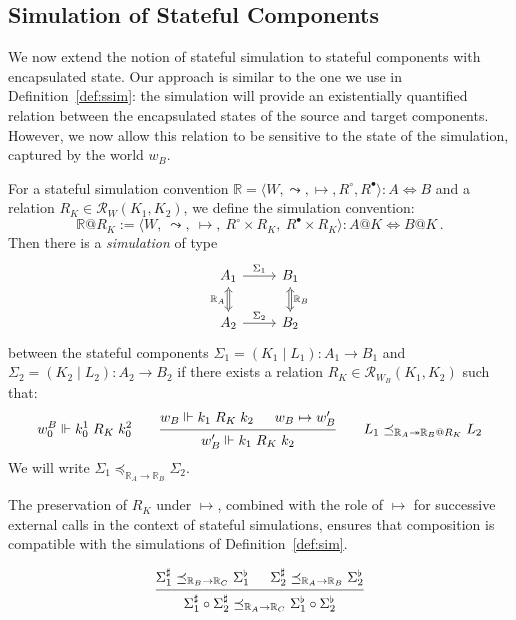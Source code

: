 \documentclass[acmsmall,screen,review,anonymous]{acmart}
\newcommand{\que}{\circ}
\newcommand{\ans}{\bullet}
\begin{document}
\subsection{Simulation of Stateful Components}

We now extend the notion of stateful simulation
to stateful components with encapsulated state.
Our approach is similar to the one we use in Definition~\ref{def:ssim}:
the simulation will provide an existentially quantified
relation between the encapsulated states of the source and target
components.
However,
we now allow this relation to be sensitive to the state of the simulation,
captured by the world $w_B$.

\begin{definition}[Simulation] \label{def:sim}
For a stateful simulation convention
$\mathbb{R} = \langle W, {\leadsto}, {\mapsto}, R^\circ, R^\bullet \rangle :
 A \Leftrightarrow B$
and a relation
$R_K \in \mathcal{R}_W(K_1, K_2)$,
we define the simulation convention:
\[
  \mathbb{R}@R_K :=
  \langle
    W, \: {\leadsto}, \: {\mapsto}, \:
    R^\que \times R_K, \:
    R^\ans \times R_K
  \rangle :
  A@K \Leftrightarrow B@K
  \,.
\]
Then there is a \emph{simulation} of type
\[
\begin{tikzcd}
  A_1 \ar[r, "\Sigma_1"]
      \ar[d, Leftrightarrow, "\mathbb{R}_A"'] &
  B_1 \ar[d, Leftrightarrow, "\mathbb{R}_B"] \\
  A_2 \ar[r, "\Sigma_2"] &
  B_2
\end{tikzcd}
\]
between
the stateful components
$\Sigma_1 = (K_1 \mid L_1) : A_1 \rightarrow B_1$ and
$\Sigma_2 = (K_2 \mid L_2) : A_2 \rightarrow B_2$
if there exists a relation
$R_K \in \mathcal{R}_{W_B}(K_1, K_2)$
such that:
\[
  w^B_0 \Vdash k^1_0 \mathrel{R_K} k^2_0
  \qquad
  \begin{prooftree}
    \hypo{w_B \Vdash k_1 \mathrel{R_K} k_2}
    \hypo{w_B \mapsto w_B'}
    \infer2{w_B' \Vdash k_1 \mathrel{R_K} k_2}
  \end{prooftree}
  \qquad
  L_1 \preceq_{\mathbb{R}_A \twoheadrightarrow \mathbb{R}_B@R_K} L_2
\]
We will write
$\Sigma_1 \preceq_{\mathbb{R}_A \rightarrow \mathbb{R}_B} \Sigma_2$.
\end{definition}

The preservation of $R_K$ under $\mapsto$,
combined with the role of $\mapsto$
for successive external calls
in the context of stateful simulations,
ensures that composition is compatible with
the simulations of Definition~\ref{def:sim}.

\begin{lemma}
\[
  \begin{prooftree}
    \hypo{
      \Sigma_1^\sharp
      \preceq_{\mathbb{R}_B \rightarrow \mathbb{R}_C}
      \Sigma_1^\flat}
    \hypo{
      \Sigma_2^\sharp
      \preceq_{\mathbb{R}_A \rightarrow \mathbb{R}_B}
      \Sigma_2^\flat}
    \infer2{
      \Sigma_1^\sharp \circ \Sigma_2^\sharp
      \preceq_{\mathbb{R}_A \rightarrow \mathbb{R}_C}
      \Sigma_1^\flat \circ \Sigma_2^\flat}
  \end{prooftree}
\]
\end{lemma}
\end{document}
